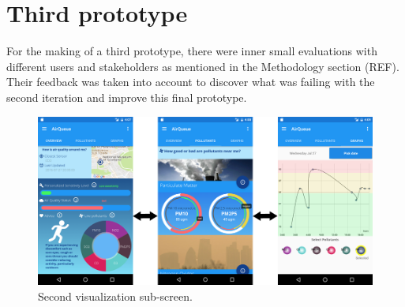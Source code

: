 \section{Third prototype}
For the making of a third prototype, there were inner small evaluations with different users and stakeholders as mentioned in the Methodology section (REF). Their feedback was taken into account to discover what was failing with the second iteration and improve this final prototype. 

\begin{figure}[H]
\begin{adjustbox}{width=1.2\textwidth,center=\textwidth}
  \centering
  \includegraphics[scale=1]{images/thirdPrototype.png}
\end{adjustbox}
  \caption[Second visualization sub-screen]{Second visualization sub-screen.}
  \label{fig:third_prototype}
\end{figure}

